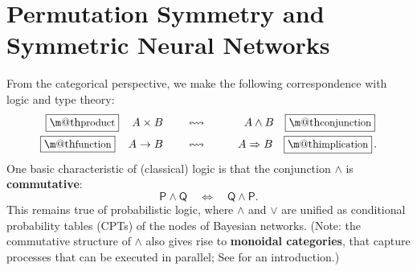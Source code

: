 \documentclass[orivec]{llncs}
\makeatletter
\renewcommand{\boxed}[1]{\fbox{\m@th$\displaystyle\scalebox{0.9}{#1}$} \,}
\makeatother
\begin{document}

\section{Permutation Symmetry and Symmetric Neural Networks}
\label{sec:commutative-structure}

From the categorical perspective, we make the following correspondence with logic and type theory:
\begin{eqnarray}
\boxed{\mbox{product}} \quad A \times B \qquad & \leftrightsquigarrow & \qquad A \wedge B \quad \boxed{\mbox{conjunction}} \nonumber \\
\boxed{\mbox{function}} \quad A \rightarrow B \qquad & \leftrightsquigarrow & \qquad A \Rightarrow B \quad \boxed{\mbox{implication}}.
\end{eqnarray}
One basic characteristic of (classical) logic is that the conjunction $\wedge$ is \textbf{commutative}:
\begin{equation}
\mathsf{P} \wedge \mathsf{Q} \quad \Leftrightarrow \quad \mathsf{Q} \wedge \mathsf{P} .
\end{equation}
This remains true of probabilistic logic, where $\wedge$ and $\vee$ are unified as conditional probability tables (CPTs) of the nodes of Bayesian networks.  (Note: the commutative structure of $\wedge$ also gives rise to \textbf{monoidal categories}, that capture processes that can be executed in parallel; See \cite{Heunen2019} for an introduction.)
\end{document}
